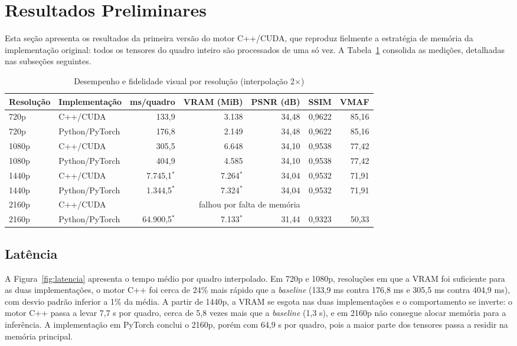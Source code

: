 \documentclass[
    12pt,                %
    openright,           %
    oneside,             %
    a4paper,             %
    english,             %
    brazil               %
]{abntex2}
\begin{document}
\section{Resultados Preliminares}
\label{sec:resultados}

Esta seção apresenta os resultados da primeira versão do motor C++/CUDA, que reproduz fielmente a estratégia de memória da implementação original: todos os tensores do quadro inteiro são processados de uma só vez. A Tabela~\ref{tab:resultados_gta} consolida as medições, detalhadas nas subseções seguintes.

\begin{table}[H]
\centering
\caption{Desempenho e fidelidade visual por resolução (interpolação 2$\times$)}
\label{tab:resultados_gta}
\small
\begin{tabular}{llrrrrr}
\toprule
\textbf{Resolução} & \textbf{Implementação} & \textbf{ms/quadro} & \textbf{VRAM (MiB)} & \textbf{PSNR (dB)} & \textbf{SSIM} & \textbf{VMAF} \\
\midrule
720p & C++/CUDA & 133,9 & 3.138 & 34,48 & 0,9622 & 85,16 \\
720p & Python/PyTorch & 176,8 & 2.149 & 34,48 & 0,9622 & 85,16 \\
\midrule
1080p & C++/CUDA & 305,5 & 6.648 & 34,10 & 0,9538 & 77,42 \\
1080p & Python/PyTorch & 404,9 & 4.585 & 34,10 & 0,9538 & 77,42 \\
\midrule
1440p & C++/CUDA & 7.745,1$^{*}$ & 7.264$^{*}$ & 34,04 & 0,9532 & 71,91 \\
1440p & Python/PyTorch & 1.344,5$^{*}$ & 7.324$^{*}$ & 34,04 & 0,9532 & 71,91 \\
\midrule
2160p & C++/CUDA & \multicolumn{5}{c}{falhou por falta de memória} \\
2160p & Python/PyTorch & 64.900,5$^{*}$ & 7.133$^{*}$ & 31,44 & 0,9323 & 50,33 \\
\bottomrule
\end{tabular}
\end{table}

\subsection{Latência}

A Figura~\ref{fig:latencia} apresenta o tempo médio por quadro interpolado. Em 720p e 1080p, resoluções em que a VRAM foi suficiente para as duas implementações, o motor C++ foi cerca de 24\% mais rápido que a \textit{baseline} (133,9 ms contra 176,8 ms e 305,5 ms contra 404,9 ms), com desvio padrão inferior a 1\% da média. A partir de 1440p, a VRAM se esgota nas duas implementações e o comportamento se inverte: o motor C++ passa a levar 7,7 s por quadro, cerca de 5,8 vezes mais que a \textit{baseline} (1,3 s), e em 2160p não consegue alocar memória para a inferência. A implementação em PyTorch conclui o 2160p, porém com 64,9 s por quadro, pois a maior parte dos tensores passa a residir na memória principal.
\end{document}
